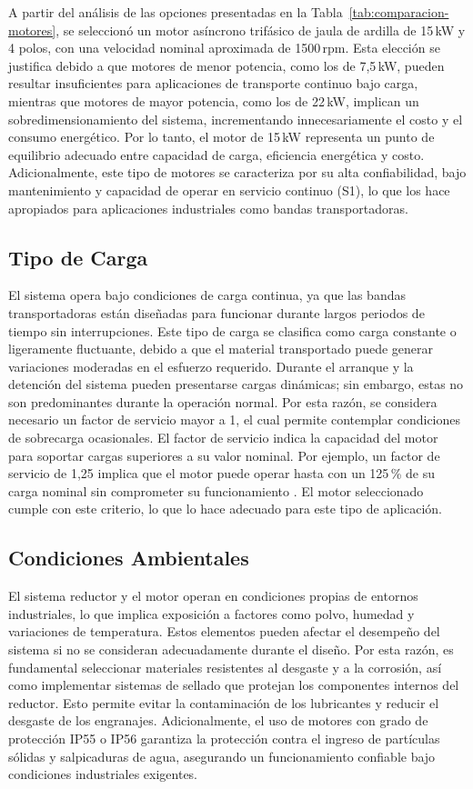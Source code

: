 \documentclass[conference]{IEEEtran}
\begin{document}
A partir del análisis de las opciones presentadas en la Tabla~\ref{tab:comparacion-motores},
se seleccionó un motor asíncrono trifásico de jaula de ardilla de 15\,kW y 4 polos, con
una velocidad nominal aproximada de 1500\,rpm. Esta elección se justifica debido a que
motores de menor potencia, como los de 7{,}5\,kW, pueden resultar insuficientes para
aplicaciones de transporte continuo bajo carga, mientras que motores de mayor potencia,
como los de 22\,kW, implican un sobredimensionamiento del sistema, incrementando
innecesariamente el costo y el consumo energético. Por lo tanto, el motor de 15\,kW
representa un punto de equilibrio adecuado entre capacidad de carga, eficiencia energética
y costo. Adicionalmente, este tipo de motores se caracteriza por su alta confiabilidad, bajo
mantenimiento y capacidad de operar en servicio continuo (S1), lo que los hace apropiados
para aplicaciones industriales como bandas transportadoras.

\subsection{Tipo de Carga}

El sistema opera bajo condiciones de carga continua, ya que las bandas transportadoras
están diseñadas para funcionar durante largos periodos de tiempo sin interrupciones. Este
tipo de carga se clasifica como carga constante o ligeramente fluctuante, debido a que el
material transportado puede generar variaciones moderadas en el esfuerzo requerido.
Durante el arranque y la detención del sistema pueden presentarse cargas dinámicas; sin
embargo, estas no son predominantes durante la operación normal. Por esta razón, se
considera necesario un factor de servicio mayor a 1, el cual permite contemplar condiciones
de sobrecarga ocasionales. El factor de servicio indica la capacidad del motor para soportar
cargas superiores a su valor nominal. Por ejemplo, un factor de servicio de 1{,}25 implica
que el motor puede operar hasta con un 125\,\% de su carga nominal sin comprometer su
funcionamiento \cite{snellgroup}. El motor seleccionado cumple con este criterio, lo que
lo hace adecuado para este tipo de aplicación.

\subsection{Condiciones Ambientales}

El sistema reductor y el motor operan en condiciones propias de entornos industriales, lo
que implica exposición a factores como polvo, humedad y variaciones de temperatura. Estos
elementos pueden afectar el desempeño del sistema si no se consideran adecuadamente
durante el diseño. Por esta razón, es fundamental seleccionar materiales resistentes al
desgaste y a la corrosión, así como implementar sistemas de sellado que protejan los
componentes internos del reductor. Esto permite evitar la contaminación de los lubricantes
y reducir el desgaste de los engranajes. Adicionalmente, el uso de motores con grado de
protección IP55 o IP56 garantiza la protección contra el ingreso de partículas sólidas y
salpicaduras de agua, asegurando un funcionamiento confiable bajo condiciones industriales
exigentes.
\end{document}
